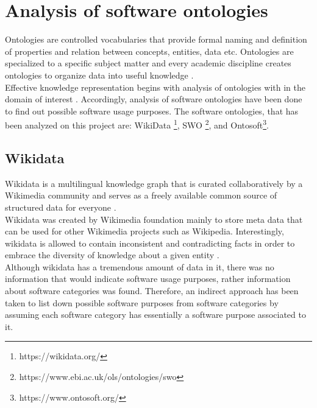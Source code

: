 \section{Analysis of software ontologies }
\label{sec:purpose:ontologies}

Ontologies are controlled vocabularies that provide formal naming and definition of properties and relation between concepts, entities, data etc.  Ontologies  are specialized  to a specific subject matter and every academic discipline creates ontologies to organize data into useful knowledge \citep{enwiki:1060388948}. \\

Effective knowledge representation begins with analysis of ontologies with in the domain of interest \citep{chandrasekaran1999ontologies}. Accordingly, analysis of software ontologies have been done to find out possible software usage purposes. The software ontologies, that has been analyzed on this project are: WikiData \footnote{https://wikidata.org/}, \ac{SWO} \footnote{https://www.ebi.ac.uk/ols/ontologies/swo}, and Ontosoft\footnote{https://www.ontosoft.org/}. 

 
\subsection{Wikidata}
\label{subsec:purpose:ontologies:Wikidata}

Wikidata is a multilingual knowledge graph that is curated collaboratively by a Wikimedia community and serves as a freely available common source of structured data for everyone \citep{enwiki:1060114687, enwiki:1060408581}. \\

Wikidata was created by Wikimedia foundation mainly to store meta data that can be used for other Wikimedia projects such as Wikipedia. Interestingly, wikidata is allowed to contain inconsistent and contradicting facts in order to embrace the diversity of knowledge about a given entity \citep{vrandevcic2012wikidata}. \\

Although wikidata has a tremendous amount of data in it, there was no information that would indicate software usage purposes, rather information about software categories was found. Therefore, an indirect approach has been taken to list down possible software purposes from software categories by assuming each software category has essentially a software purpose associated to it. \\

